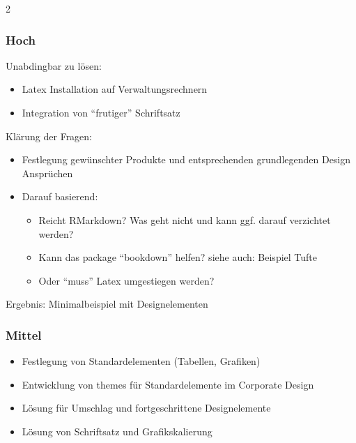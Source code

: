 \documentclass[
  a4paper,
  twoside]{article}
\providecommand{\tightlist}{%
  \setlength{\itemsep}{0pt}\setlength{\parskip}{0pt}}
\begin{document}
\begin {multicols}{2}

\hypertarget{hoch}{%
\subsubsection{Hoch}\label{hoch}}

Unabdingbar zu lösen:

\begin{itemize}
\tightlist
\item
  Latex Installation auf Verwaltungsrechnern
\item
  Integration von ``frutiger'' Schriftsatz
\end{itemize}

Klärung der Fragen:

\begin{itemize}
\tightlist
\item
  Festlegung gewünschter Produkte und entsprechenden grundlegenden Design Ansprüchen
\item
  Darauf basierend:

  \begin{itemize}
  \tightlist
  \item
    Reicht RMarkdown? Was geht nicht und kann ggf. darauf verzichtet werden?
  \item
    Kann das package ``bookdown'' helfen? siehe auch: Beispiel Tufte
  \item
    Oder ``muss'' Latex umgestiegen werden?
  \end{itemize}
\end{itemize}

Ergebnis: Minimalbeispiel mit Designelementen

\columnbreak

\hypertarget{mittel}{%
\subsubsection{Mittel}\label{mittel}}

\begin{itemize}
\tightlist
\item
  Festlegung von Standardelementen (Tabellen, Grafiken)
\item
  Entwicklung von themes für Standardelemente im Corporate Design
\item
  Lösung für Umschlag und fortgeschrittene Designelemente
\item
  Lösung von Schriftsatz und Grafikskalierung
\end{itemize}


\end{multicols}
\end{document}
